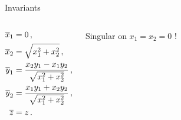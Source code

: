 \documentclass{beamer}
\begin{document}
\begin{frame}{Invariants}
 \begin{columns}
  \begin{block}{}
  	\[
  	 \begin{split}
	\overline{x}_1 &= 0\,, \\ 
	\overline{x}_2 &= \sqrt{x_1^2+x_2^2} \,, \\ 
	\overline{y}_1 &= \frac{x_2 y_1-x_1 y_2}{\sqrt{x_1^2+x_2^2}}\,, \\ 
	\overline{y}_2 &=\frac{x_1 y_1+x_2 y_2}{\sqrt{x_1^2+x_2^2}}\,, \\ 
	\overline{z} &= z\,.
	\end{split}
  	\]
  \end{block}
  \begin{block}{}
	  \alert{Singular on $x_1=x_2=0$ !}
  \end{block}	
 \end{columns}
\end{frame}
\end{document}
